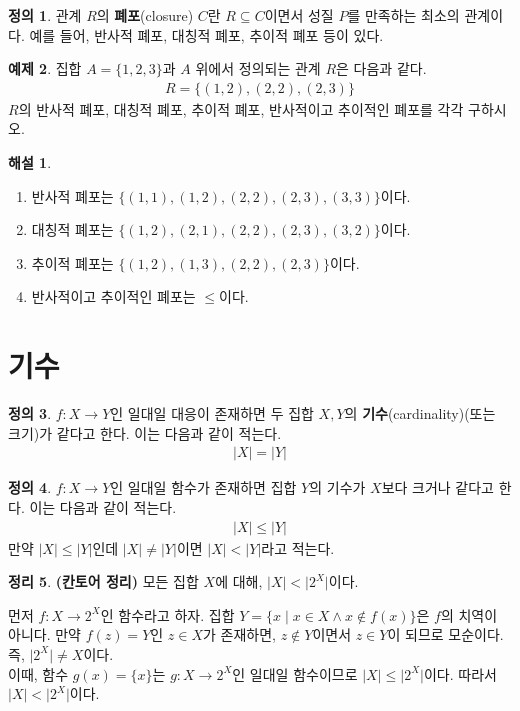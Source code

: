 \documentclass[b5paper, 11pt]{book}
\theoremstyle{definition}
\newtheorem{defn}{정의}[chapter]
\newtheorem{thm}[defn]{정리}
\newtheorem{ex}[defn]{예제}
\newtheorem*{ans*}{해설}
\newenvironment{pf*}{\pushQED{\qed}\pf}
{\popQED\endpf}
\begin{document}
\begin{defn}
    관계 $R$의 \textbf{폐포}(closure) $C$란 $R \subseteq C$이면서 성질 $P$를 만족하는 최소의
    관계이다. 예를 들어, 반사적 폐포, 대칭적 폐포, 추이적 폐포 등이 있다. 
\end{defn}
\begin{ex}
    집합 $A = \{1, 2, 3\}$과 $A$ 위에서 정의되는 관계 $R$은 다음과 같다.
    \begin{align*}
        R = \{(1,2), (2, 2), (2, 3)\}
    \end{align*}
    $R$의 반사적 폐포, 대칭적 폐포, 추이적 폐포, 반사적이고 추이적인 폐포를 각각 구하시오.
\end{ex}
\begin{ans*}
    \begin{enumerate}
        \item 반사적 폐포는 $\{(1, 1), (1, 2), (2, 2), (2, 3), (3, 3)\}$이다.
        \item 대칭적 폐포는 $\{(1, 2), (2, 1), (2, 2), (2, 3), (3, 2)\}$이다.
        \item 추이적 폐포는 $\{(1, 2),(1, 3), (2, 2), (2, 3) \}$이다.
        \item 반사적이고 추이적인 폐포는 $\le$이다. 
    \end{enumerate}
\end{ans*}
\section{기수}
\begin{defn}
    $f: X \rightarrow Y$인 일대일 대응이 존재하면
    두 집합 $X, Y$의 \textbf{기수}(cardinality)(또는 크기)가 같다고 한다.
     이는 다음과 같이 적는다.
    \begin{align*}
        \vert X \vert = \vert Y \vert
    \end{align*}
\end{defn}
\begin{defn}
    $f: X \rightarrow Y$인 일대일 함수가
    존재하면 집합 $Y$의 기수가 $X$보다 크거나 같다고 한다. 이는 다음과 같이 적는다.
    \begin{align*}
        \vert X \vert \le \vert Y \vert
    \end{align*} 
    만약 $\vert X \vert \le \vert Y \vert$인데 $\vert X \vert \neq \vert Y \vert$이면
    $\vert X \vert < \vert Y \vert$라고 적는다.
\end{defn}
\begin{thm}
    \textbf{(칸토어 정리)} 모든 집합 $X$에 대해, $\vert X \vert < \vert 2^X \vert$이다.
\end{thm}
\begin{pf*}
    먼저 $f: X \rightarrow 2^X$인 함수라고 하자. 집합 $Y = \{x \;\vert\; x \in X \wedge
    x \notin f(x)\}$은 $f$의 치역이 아니다. 만약 $f(z) = Y$인 $z \in X$가 존재하면,
    $z \notin Y$이면서 $z \in Y$이 되므로 모순이다. 즉, $\vert 2^X \vert
    \neq X$이다. \\ 
    이때, 함수 $g(x) = \{x\}$는 $g: X \rightarrow 2^X$인 일대일 함수이므로
    $\vert X \vert \le \vert 2^X \vert$이다. 따라서 $\vert X \vert < \vert 2^X \vert$이다.
\end{pf*}
\end{document}

